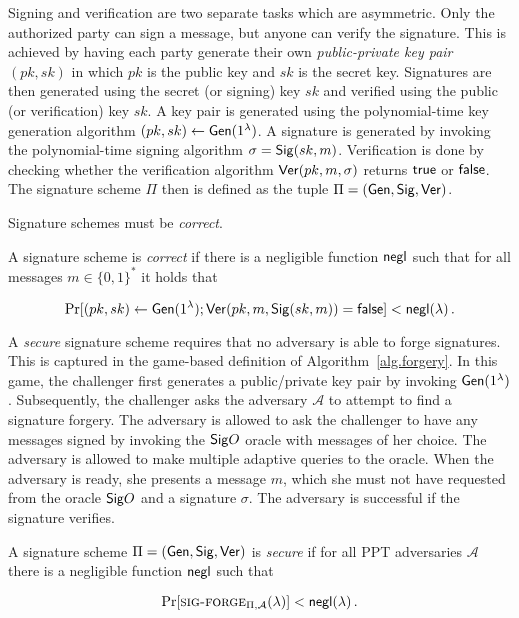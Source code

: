 Signing and verification are two separate tasks which are asymmetric. Only the
authorized party can sign a message, but anyone can verify the signature. This
is achieved by having each party generate their own \emph{public-private
key pair} $(pk, sk)$ in which $pk$ is the public key and $sk$ is the secret key.
Signatures are then generated using the secret (or signing) key $sk$ and
verified using the public (or verification) key $sk$. A key pair is generated
using the polynomial-time key generation algorithm $(pk, sk) \gets
\mathsf{Gen}(1^\lambda)$. A signature is generated by invoking the polynomial-time
signing algorithm $\sigma = \mathsf{Sig}(sk, m)$. Verification is done by checking
whether the verification algorithm $\mathsf{Ver}(pk, m, \sigma)$ returns $\textsf{true}$ or
$\textsf{false}$. The signature scheme $\Pi$ then is defined as the tuple
$\Pi = (\mathsf{Gen}, \mathsf{Sig}, \mathsf{Ver})$.

Signature schemes must be \emph{correct}.

\begin{definition}
  A signature scheme is \emph{correct} if there is a
  negligible function $\mathsf{negl}$ such that for all messages $m \in \{0, 1\}^*$ it
  holds that

  \[
    \Pr[(pk, sk) \gets \mathsf{Gen}(1^\lambda); \mathsf{Ver}(pk, m, \mathsf{Sig}(sk, m)) = \textsf{false}] < \mathsf{negl}(\lambda)\,.
  \]
\end{definition}

A \emph{secure} signature scheme requires that no adversary is able to forge
signatures. This is captured in the game-based definition of Algorithm~\ref{alg.forgery}. In this game, the challenger first generates a public/private key pair by invoking $\mathsf{Gen}(1^\lambda)$. Subsequently, the challenger asks the adversary $\mathcal{A}$ to attempt to find a signature forgery. The adversary is allowed to ask the challenger to have any messages signed by invoking the ${\mathsf{Sig}}O$ oracle with messages of her choice. The adversary is allowed to make multiple adaptive queries to the oracle. When the adversary is ready, she presents a message $m$, which she must not have requested from the oracle ${\mathsf{Sig}}O$ and a signature $\sigma$. The adversary is successful if the signature verifies.



\begin{definition}[Security]
  A signature scheme $\Pi = (\mathsf{Gen}, \mathsf{Sig}, \mathsf{Ver})$ is \emph{secure} if for all PPT adversaries $\mathcal{A}$ there is a negligible function $\mathsf{negl}$ such that

  \[
  \Pr[\textsc{sig-forge}_{\Pi,\mathcal{A}}(\lambda)] < \mathsf{negl}(\lambda)\,.
  \]
\end{definition}

